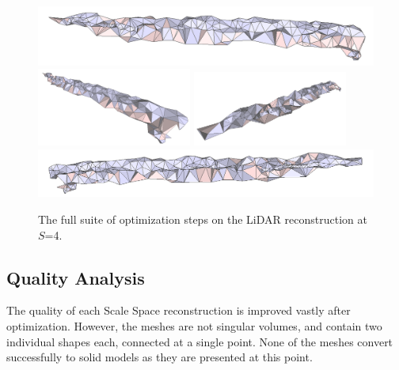 \documentclass[12pt]{drexelthesis}
\let\Oldsubsection\subsection
\renewcommand{\subsection}{\FloatBarrier\Oldsubsection}
\begin{document}
\begin{figure}[!ht]
	\centering
		\includegraphics[width=5in]{real-lab-scans/optimizedNeat/scalespace4everything00.png}
		\includegraphics[width=2in]{real-lab-scans/optimizedNeat/scalespace4everything01.png}
		\includegraphics[width=2in]{real-lab-scans/optimizedNeat/scalespace4everything02.png}
		\includegraphics[width=5in]{real-lab-scans/optimizedNeat/scalespace4everything03.png}
		\caption[The full suite of optimization steps on the LiDAR reconstruction at $S$=4.]{\centering The full suite of optimization steps on the LiDAR reconstruction at $S$=4.}
	\label{lidar:scalespace4everything}
\end{figure}

\subsection{Quality Analysis}

The quality of each Scale Space reconstruction is improved vastly after optimization. However, the meshes are not singular volumes, and contain two individual shapes each, connected at a single point. None of the meshes convert successfully to solid models as they are presented at this point.
\end{document}
